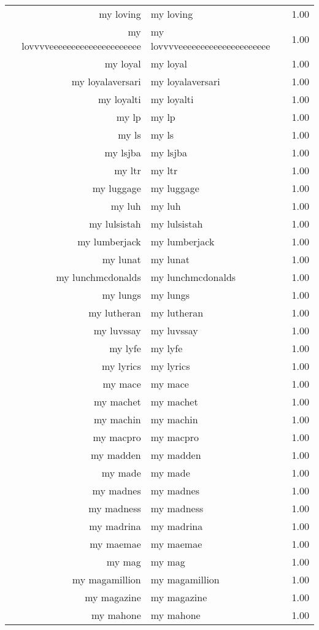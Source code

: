 \begin{table}[ht]
\begin{tabular}{rlr}
  my loving & my loving & 1.00 \\ 
  my lovvvveeeeeeeeeeeeeeeeeeeee & my lovvvveeeeeeeeeeeeeeeeeeeee & 1.00 \\ 
  my loyal & my loyal & 1.00 \\ 
  my loyalaversari & my loyalaversari & 1.00 \\ 
  my loyalti & my loyalti & 1.00 \\ 
  my lp & my lp & 1.00 \\ 
  my ls & my ls & 1.00 \\ 
  my lsjba & my lsjba & 1.00 \\ 
  my ltr & my ltr & 1.00 \\ 
  my luggage & my luggage & 1.00 \\ 
  my luh & my luh & 1.00 \\ 
  my lulsistah & my lulsistah & 1.00 \\ 
  my lumberjack & my lumberjack & 1.00 \\ 
  my lunat & my lunat & 1.00 \\ 
  my lunchmcdonalds & my lunchmcdonalds & 1.00 \\ 
  my lungs & my lungs & 1.00 \\ 
  my lutheran & my lutheran & 1.00 \\ 
  my luvssay & my luvssay & 1.00 \\ 
  my lyfe & my lyfe & 1.00 \\ 
  my lyrics & my lyrics & 1.00 \\ 
  my mace & my mace & 1.00 \\ 
  my machet & my machet & 1.00 \\ 
  my machin & my machin & 1.00 \\ 
  my macpro & my macpro & 1.00 \\ 
  my madden & my madden & 1.00 \\ 
  my made & my made & 1.00 \\ 
  my madnes & my madnes & 1.00 \\ 
  my madness & my madness & 1.00 \\ 
  my madrina & my madrina & 1.00 \\ 
  my maemae & my maemae & 1.00 \\ 
  my mag & my mag & 1.00 \\ 
  my magamillion & my magamillion & 1.00 \\ 
  my magazine & my magazine & 1.00 \\ 
  my mahone & my mahone & 1.00 \\ 

\end{tabular}
\end{table}
